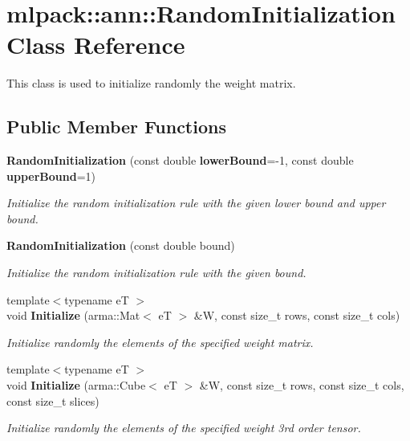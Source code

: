 \section{mlpack\+:\+:ann\+:\+:Random\+Initialization Class Reference}
\label{classmlpack_1_1ann_1_1RandomInitialization}


This class is used to initialize randomly the weight matrix.  


\subsection*{Public Member Functions}
\begin{DoxyCompactItemize}
\item 
{\bf Random\+Initialization} (const double {\bf lower\+Bound}=-\/1, const double {\bf upper\+Bound}=1)
\begin{DoxyCompactList}\small\item\em Initialize the random initialization rule with the given lower bound and upper bound. \end{DoxyCompactList}\item 
{\bf Random\+Initialization} (const double bound)
\begin{DoxyCompactList}\small\item\em Initialize the random initialization rule with the given bound. \end{DoxyCompactList}\item 
{\footnotesize template$<$typename eT $>$ }\\void {\bf Initialize} (arma\+::\+Mat$<$ eT $>$ \&W, const size\+\_\+t rows, const size\+\_\+t cols)
\begin{DoxyCompactList}\small\item\em Initialize randomly the elements of the specified weight matrix. \end{DoxyCompactList}\item 
{\footnotesize template$<$typename eT $>$ }\\void {\bf Initialize} (arma\+::\+Cube$<$ eT $>$ \&W, const size\+\_\+t rows, const size\+\_\+t cols, const size\+\_\+t slices)
\begin{DoxyCompactList}\small\item\em Initialize randomly the elements of the specified weight 3rd order tensor. \end{DoxyCompactList}\end{DoxyCompactItemize}
